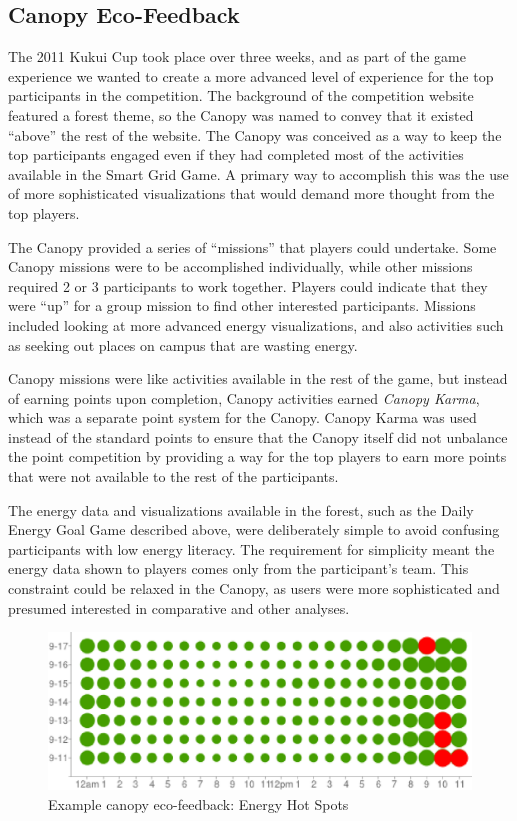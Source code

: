 \documentclass{sigchi}
\begin{document}
\subsection{Canopy Eco-Feedback}

The 2011 Kukui Cup took place over three weeks, and as part of the game experience we wanted to create a more advanced level of experience for the top participants in the competition. The background of the competition website featured a forest theme, so the Canopy was named to convey that it existed ``above'' the rest of the website. The Canopy was conceived as a way to keep the top participants engaged even if they had completed most of the activities available in the Smart Grid Game. A primary way to accomplish this was the use of more sophisticated visualizations that would demand more thought from the top players. 

The Canopy provided a series of ``missions'' that players could undertake. Some Canopy missions were to be accomplished individually, while other missions required 2 or 3 participants to work together. Players could indicate that they were ``up'' for a group mission to find other interested participants. Missions included looking at more advanced energy visualizations, and also activities such as seeking out places on campus that are wasting energy.

Canopy missions were like activities available in the rest of the game, but instead of earning points upon completion, Canopy activities earned \emph{Canopy Karma}, which was a separate point system for the Canopy. Canopy Karma was used instead of the standard points to ensure that the Canopy itself did not unbalance the point competition by providing a way for the top players to earn more points that were not available to the rest of the participants.

The energy data and visualizations available in the forest, such as the Daily Energy Goal Game described above, were deliberately simple to avoid confusing participants with low energy literacy. The requirement for simplicity meant the energy data shown to players comes only from the participant's team. This constraint could be relaxed in the Canopy, as users were more sophisticated and presumed interested in comparative and other analyses.

\begin{figure}[!tb]
	\centering
	\includegraphics[width=0.95\columnwidth]{hot-spots-crop2.eps}
	\caption{Example canopy eco-feedback: Energy Hot Spots}
	\label{fig:hot-spots}
\end{figure}
\end{document}
